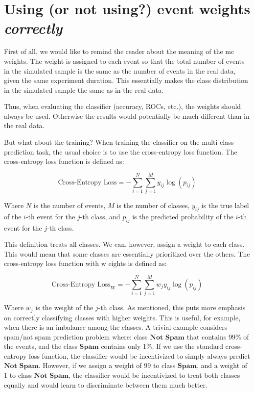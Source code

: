 \section{Using (or not using?) event weights \em{correctly}}
\label{sec:weights}

First of all, we would like to remind the reader about the meaning of the \gls{mc} weights. The weight is assigned to
each event so that the total number of events in the simulated sample is the same as the number of events in the real
data, given the same experiment duration. This essentially makes the class distribution in the simulated sample the same
as in the real data.

Thus, when evaluating the classifier (accuracy, ROCs, etc.), the weights should always be used.
Otherwise the results would potentially be much different than in the real data.

But what about the training? When training the classifier on the multi-class prediction task, the usual choice is to use
the cross-entropy loss function. The cross-entropy loss function is defined as:

$$
    \text{Cross-Entropy Loss} = -\sum_{i=1}^{N} \sum_{j=1}^{M} y_{ij} \log(p_{ij})
$$

Where $N$ is the number of events, $M$ is the number of classes, $y_{ij}$ is the true label of the $i$-th event for the
$j$-th class, and $p_{ij}$ is the predicted probability of the $i$-th event for the $j$-th class.

This definition treats all classes. We can, however, assign a weight to each class. This would mean that some classes
are essentially prioritized over the others. The cross-entropy loss function with w eights is defined as:

$$
    \text{Cross-Entropy Loss}_\text{W} = -\sum_{i=1}^{N} \sum_{j=1}^{M} w_j y_{ij} \log(p_{ij})
$$

Where $w_j$ is the weight of the $j$-th class. As mentioned, this puts more emphasis on correctly classifying classes
with higher weights. This is useful, for example, when there is an imbalance among the classes. A trivial example
considers spam/not spam prediction problem where: class $\textbf{Not Spam}$ that contains 99\% of the events, and the
class $\textbf{Spam}$ contains only 1\%. If we use the standard cross-entropy loss function, the classifier would be
incentivized to simply always predict $\textbf{Not Spam}$. However, if we assign a weight of 99 to class
$\textbf{Spam}$, and a weight of 1 to class $\textbf{Not Spam}$, the classifier would be incentivized to treat both
classes equally and would learn to discriminate between them much better.


